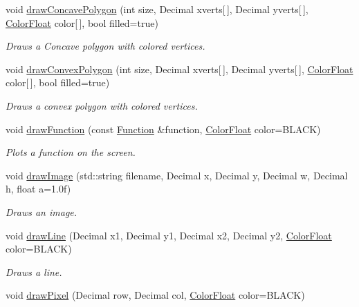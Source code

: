 \begin{DoxyCompactItemize}
void \hyperlink{classtsgl_1_1_cartesian_canvas_a7f84b79ab6fd77277c5c71fce7d0ec6a}{draw\+Concave\+Polygon} (int size, Decimal xverts\mbox{[}$\,$\mbox{]}, Decimal yverts\mbox{[}$\,$\mbox{]}, \hyperlink{structtsgl_1_1_color_float}{Color\+Float} color\mbox{[}$\,$\mbox{]}, bool filled=true)
\begin{DoxyCompactList}\small\item\em Draws a Concave polygon with colored vertices. \end{DoxyCompactList}\item 
void \hyperlink{classtsgl_1_1_cartesian_canvas_abefc7f373711cdff2477d0665b37212f}{draw\+Convex\+Polygon} (int size, Decimal xverts\mbox{[}$\,$\mbox{]}, Decimal yverts\mbox{[}$\,$\mbox{]}, \hyperlink{structtsgl_1_1_color_float}{Color\+Float} color\mbox{[}$\,$\mbox{]}, bool filled=true)
\begin{DoxyCompactList}\small\item\em Draws a convex polygon with colored vertices. \end{DoxyCompactList}\item 
void \hyperlink{classtsgl_1_1_cartesian_canvas_aa2da030609cf410eecfc154fd67491cf}{draw\+Function} (const \hyperlink{classtsgl_1_1_function}{Function} \&function, \hyperlink{structtsgl_1_1_color_float}{Color\+Float} color=B\+L\+A\+C\+K)
\begin{DoxyCompactList}\small\item\em Plots a function on the screen. \end{DoxyCompactList}\item 
void \hyperlink{classtsgl_1_1_cartesian_canvas_ab2f3e7633f4f05711083eba01b0a3f4e}{draw\+Image} (std\+::string filename, Decimal x, Decimal y, Decimal w, Decimal h, float a=1.\+0f)
\begin{DoxyCompactList}\small\item\em Draws an image. \end{DoxyCompactList}\item 
void \hyperlink{classtsgl_1_1_cartesian_canvas_ace015a630f1ff280b2ecd6a864cdc5e2}{draw\+Line} (Decimal x1, Decimal y1, Decimal x2, Decimal y2, \hyperlink{structtsgl_1_1_color_float}{Color\+Float} color=B\+L\+A\+C\+K)
\begin{DoxyCompactList}\small\item\em Draws a line. \end{DoxyCompactList}\item 
void \hyperlink{classtsgl_1_1_cartesian_canvas_ad0bdf8651a9f703cfd6f71a6bd6ffe17}{draw\+Pixel} (Decimal row, Decimal col, \hyperlink{structtsgl_1_1_color_float}{Color\+Float} color=B\+L\+A\+C\+K)

\end{DoxyCompactItemize}
